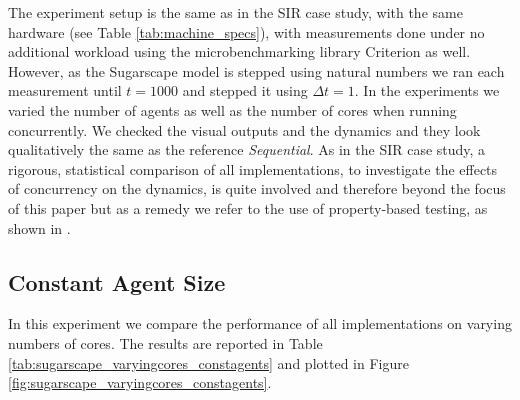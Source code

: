 \medskip

The experiment setup is the same as in the SIR case study, with the same hardware (see Table \ref{tab:machine_specs}), with measurements done under no additional workload using the microbenchmarking library Criterion \cite{criterion_serpentine, criterion_hackage} as well. However, as the Sugarscape model is stepped using natural numbers we ran each measurement until $t = 1000$ and stepped it using $\Delta t = 1$. In the experiments we varied the number of agents as well as the number of cores when running concurrently. We checked the visual outputs and the dynamics and they look qualitatively the same as the reference \textit{Sequential}. As in the SIR case study, a rigorous, statistical comparison of all implementations, to investigate the effects of concurrency on the dynamics, is quite involved and therefore beyond the focus of this paper but as a remedy we refer to the use of property-based testing, as shown in \cite{thaler_show_2019}.

\subsection{Constant Agent Size}
In this experiment we compare the performance of all implementations on varying numbers of cores. The results are reported in Table \ref{tab:sugarscape_varyingcores_constagents} and plotted in Figure \ref{fig:sugarscape_varyingcores_constagents}. 

